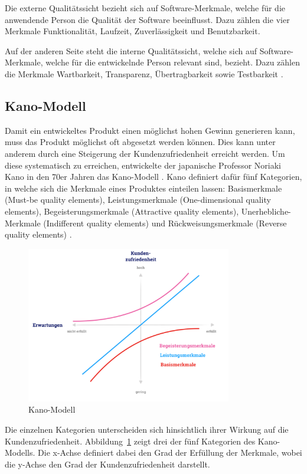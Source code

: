 Die externe Qualitätssicht bezieht sich auf Software-Merkmale, welche für die anwendende Person die Qualität der Software beeinflusst.
Dazu zählen die vier Merkmale Funktionalität, Laufzeit, Zuverlässigkeit und Benutzbarkeit.

Auf der anderen Seite steht die interne Qualitätssicht, welche sich auf Software-Merkmale, welche für die entwickelnde Person relevant sind, bezieht.
Dazu zählen die Merkmale Wartbarkeit, Transparenz, Übertragbarkeit sowie Testbarkeit \autocite[vgl.][S. 6-10]{hoffmann_software-qualitat_2013}.

\subsection{Kano-Modell}
Damit ein entwickeltes Produkt einen möglichst hohen Gewinn generieren kann, muss das Produkt möglichst oft abgesetzt werden können.
Dies kann unter anderem durch eine Steigerung der Kundenzufriedenheit erreicht werden.
Um diese systematisch zu erreichen, entwickelte der japanische Professor Noriaki Kano in den 70er Jahren das Kano-Modell \autocite[vgl.][S. 27]{sauerwein_kano-modell_2000}.
Kano definiert dafür fünf Kategorien, in welche sich die Merkmale eines Produktes einteilen lassen: 
Basismerkmale (Must-be quality elements), Leistungsmerkmale (One-dimensional quality elements), Begeisterungsmerkmale (Attractive quality elements), Unerhebliche-Merkmale (Indifferent quality elements) und Rückweisungsmerkmale (Reverse quality elements) \autocite[vgl.][S. 82-83]{holzing_kano-theorie_2008}.

\begin{figure}
  \centering
  \includegraphics[width=0.8\textwidth, keepaspectratio]{images/kano-modell.png}
  \caption{Kano-Modell \autocite{diehl_kano_2019}}
  \label{fig:kano-modell}
\end{figure}
Die einzelnen Kategorien unterscheiden sich hinsichtlich ihrer Wirkung auf die Kundenzufriedenheit.
Abbildung~\ref{fig:kano-modell} zeigt drei der fünf Kategorien des Kano-Modells.
Die x-Achse definiert dabei den Grad der Erfüllung der Merkmale, wobei die y-Achse den Grad der Kundenzufriedenheit darstellt.

